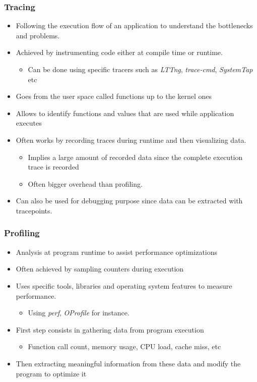 \begin{frame}
  \frametitle{Tracing}
  \begin{itemize}
    \item Following the execution flow of an application to understand the
          bottlenecks and problems.
    \item Achieved by instrumenting code either at compile time or runtime.
    \begin{itemize}
      \item Can be done using specific tracers such as {\em LTTng},
            {\em trace-cmd}, {\em SystemTap} etc
    \end{itemize}
    \item Goes from the user space called functions up to the kernel ones
    \item Allows to identify functions and values that are used while
          application executes
    \item Often works by recording traces during runtime and then visualizing
          data.
    \begin{itemize}
      \item Implies a large amount of recorded data since the complete execution
            trace is recorded
      \item Often bigger overhead than profiling.
    \end{itemize}
    \item Can also be used for debugging purpose since data can be extracted
          with tracepoints.
  \end{itemize}
\end{frame}

\begin{frame}
  \frametitle{Profiling}
  \begin{itemize}
    \item Analysis at program runtime to assist performance optimizations
    \item Often achieved by sampling counters during execution
    \item Uses specific tools, libraries and operating system features to
          measure performance.
    \begin{itemize}
      \item Using {\em perf}, {\em OProfile} for instance.
    \end{itemize}
    \item First step consists in gathering data from program execution
    \begin{itemize}
      \item Function call count, memory usage, CPU load, cache miss, etc
    \end{itemize}
    \item Then extracting meaningful information from these data and modify the
          program to optimize it
\end{itemize}
\end{frame}


